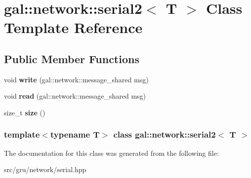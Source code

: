 \hypertarget{classgal_1_1network_1_1serial2}{\section{gal\-:\-:network\-:\-:serial2$<$ \-T $>$ \-Class \-Template \-Reference}
\label{classgal_1_1network_1_1serial2}
}
\subsection*{\-Public \-Member \-Functions}
\begin{DoxyCompactItemize}
\item 
\hypertarget{classgal_1_1network_1_1serial2_afb7c93f57726c3dd3ec0332134bcd9b2}{void {\bfseries write} (gal\-::network\-::message\-\_\-shared msg)}\label{classgal_1_1network_1_1serial2_afb7c93f57726c3dd3ec0332134bcd9b2}

\item 
\hypertarget{classgal_1_1network_1_1serial2_ad1dd2750aa53ca2294b34a7f04a5cef7}{void {\bfseries read} (gal\-::network\-::message\-\_\-shared msg)}\label{classgal_1_1network_1_1serial2_ad1dd2750aa53ca2294b34a7f04a5cef7}

\item 
\hypertarget{classgal_1_1network_1_1serial2_adb6e73cdcbc1f67f71eaed2bdbeab6bb}{size\-\_\-t {\bfseries size} ()}\label{classgal_1_1network_1_1serial2_adb6e73cdcbc1f67f71eaed2bdbeab6bb}

\end{DoxyCompactItemize}
\subsubsection*{template$<$typename T$>$ class gal\-::network\-::serial2$<$ T $>$}



\-The documentation for this class was generated from the following file\-:\begin{DoxyCompactItemize}
\item 
src/gru/network/serial.\-hpp\end{DoxyCompactItemize}
